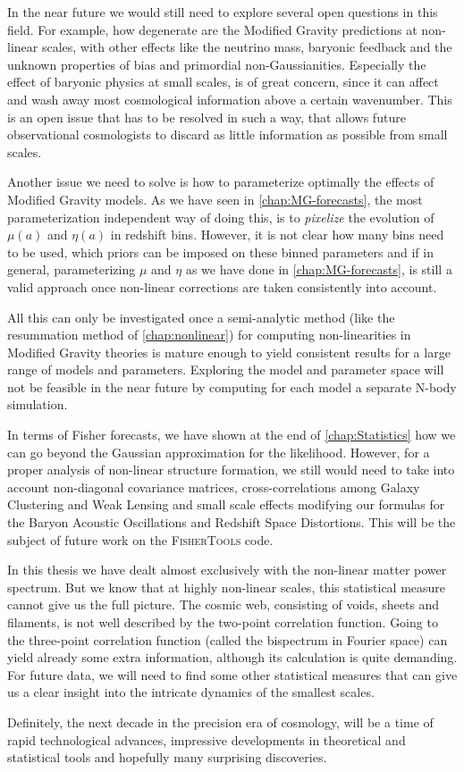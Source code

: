 In the near future we would still need to explore several open questions in this field.
For example, how degenerate are the Modified Gravity predictions at non-linear scales, with other
effects like the neutrino mass, baryonic feedback and the unknown properties of bias and primordial non-Gaussianities.
Especially the effect of baryonic physics at small scales, is of great concern, since it can affect and wash away
most cosmological information above a certain wavenumber. This is an open issue that has to be resolved in such a way, that allows 
future observational cosmologists to discard as little information as possible from small scales.

Another issue we need to solve is how to parameterize optimally the effects of Modified Gravity models. As we have seen 
in \cref{chap:MG-forecasts}, the most parameterization independent way of doing this, is to \emph{pixelize} the evolution
of $\mu(a)$ and $\eta(a)$ in redshift bins. However, it is not clear how many bins need to be used, which
priors can be imposed on these binned parameters and if in general, parameterizing $\mu$ and $\eta$ as we have done in 
\cref{chap:MG-forecasts}, is still a valid approach once non-linear corrections are taken consistently into account.

All this can only be investigated once a semi-analytic method (like the resummation method of \cref{chap:nonlinear}) 
for computing non-linearities in Modified Gravity theories is mature enough to yield consistent results for 
a large range of models and parameters. Exploring
the model and parameter space will not be feasible in the near future by computing for each model a separate N-body simulation.

In terms of Fisher forecasts, we have shown at the end of \cref{chap:Statistics} how we can go beyond the Gaussian approximation for the likelihood.
However, for a proper analysis of non-linear structure formation, we still would need to take into account 
non-diagonal covariance matrices, cross-correlations among Galaxy Clustering and Weak Lensing and small scale effects
modifying our formulas for the Baryon Acoustic Oscillations and Redshift Space Distortions. This will be the subject of future
work on the \textsc{FisherTools} code.

In this thesis we have dealt almost exclusively with the non-linear matter power spectrum. But we know that at highly non-linear scales,
this statistical measure cannot give us the full picture. The cosmic web, consisting of voids, sheets and filaments, is not
well described by the two-point correlation function. Going to the three-point correlation function (called the bispectrum in Fourier space)
can yield already some extra information, although its calculation is quite demanding. 
For future data, we will need to find
some other statistical measures that can give us a clear insight into the intricate dynamics of the smallest scales.

Definitely, the next decade in the precision era of cosmology, will be a time of rapid technological advances,
impressive developments in theoretical and statistical tools and hopefully 
many surprising discoveries.










